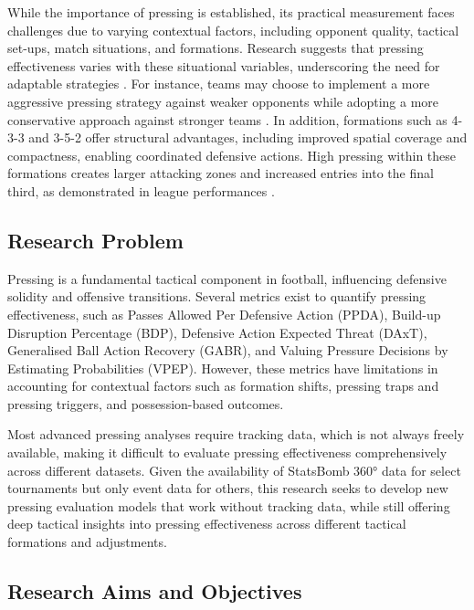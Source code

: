 \documentclass[12pt]{article}
\begin{document}
While the importance of pressing is established, its practical measurement faces challenges due to varying contextual factors, including opponent quality, tactical set-ups, match situations, and formations. Research suggests that pressing effectiveness varies with these situational variables, underscoring the need for adaptable strategies \citep{ruan_quantifying_2022, toda_evaluation_2022}. For instance, teams may choose to implement a more aggressive pressing strategy against weaker opponents while adopting a more conservative approach against stronger teams \citep{bauer_putting_2023, forcher_leander_is_2024}. In addition, formations such as 4-3-3 and 3-5-2 offer structural advantages, including improved spatial coverage and compactness, enabling coordinated defensive actions. High pressing within these formations creates larger attacking zones and increased entries into the final third, as demonstrated in league performances \citep{brindescu_study_2021, scotognella_simulations_2021}.

\subsection{Research Problem}

Pressing is a fundamental tactical component in football, influencing defensive solidity and offensive transitions. Several metrics exist to quantify pressing effectiveness, such as Passes Allowed Per Defensive Action (PPDA), Build-up Disruption Percentage (BDP), Defensive Action Expected Threat (DAxT), Generalised Ball Action Recovery (GABR), and Valuing Pressure Decisions by Estimating Probabilities (VPEP). However, these metrics have limitations in accounting for contextual factors such as formation shifts, pressing traps and pressing triggers, and possession-based outcomes.

Most advanced pressing analyses require tracking data, which is not always freely available, making it difficult to evaluate pressing effectiveness comprehensively across different datasets. Given the availability of StatsBomb 360° data for select tournaments but only event data for others, this research seeks to develop new pressing evaluation models that work without tracking data, while still offering deep tactical insights into pressing effectiveness across different tactical formations and adjustments.

\subsection{Research Aims and Objectives}
\end{document}
